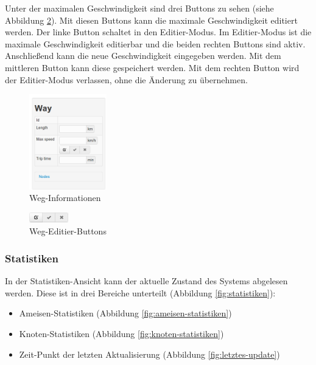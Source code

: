 Unter der maximalen Geschwindigkeit sind drei Buttons zu sehen (siehe Abbildung \ref{fig:weg-editier-buttons}).
Mit diesen Buttons kann die maximale Geschwindigkeit editiert werden.
Der linke Button schaltet in den Editier-Modus.
Im Editier-Modus ist die maximale Geschwindigkeit editierbar und die beiden rechten Buttons sind aktiv.
Anschließend kann die neue Geschwindigkeit eingegeben werden.
Mit dem mittleren Button kann diese gespeichert werden.
Mit dem rechten Button wird der Editier-Modus verlassen, ohne die Änderung zu übernehmen.

\begin{figure}[htbp]
  \centering
  \includegraphics[width=0.3\textwidth]{Bilder/Weg-Informationen.png}
  \caption{Weg-Informationen}
  \label{fig:weg-informationen}
\end{figure}

\begin{figure}[htbp]
  \centering
  \includegraphics[width=0.15\textwidth]{Bilder/Weg-Editier-Buttons.png}
  \caption{Weg-Editier-Buttons}
  \label{fig:weg-editier-buttons}
\end{figure}

\subsubsection{Statistiken}
\label{sec:statistiken}

In der Statistiken-Ansicht kann der aktuelle Zustand des Systems abgelesen werden.
Diese ist in drei Bereiche unterteilt (Abbildung \ref{fig:statistiken}):

\begin{itemize}
  \item Ameisen-Statistiken (Abbildung \ref{fig:ameisen-statistiken})
  \item Knoten-Statistiken (Abbildung \ref{fig:knoten-statistiken})
  \item Zeit-Punkt der letzten Aktualisierung (Abbildung \ref{fig:letztes-update})
\end{itemize}

